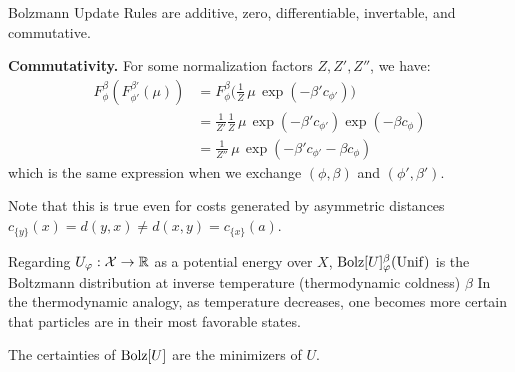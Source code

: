 \documentclass{article}
\newcommand{\Unif}{\mathrm{Unif}}
\begin{document}
\begin{prop}
    Bolzmann Update Rules are additive, zero, differentiable, invertable, and commutative.
\end{prop}

\begin{lproof}
    \textbf{Commutativity.}
    For some normalization factors $Z, Z', Z''$, we have:
    \begin{align*}
         F^\beta_\phi( F^{\beta'}_{\phi'}(\mu))
         &= F^\beta_\phi \Big( \frac{1}{Z} \,\mu\, \exp(- \beta' c_{\phi'}) \Big) \\
         &= \frac{1}{Z'} \frac{1}{Z} \,\mu\, \exp(- \beta' c_{\phi'}) \exp(- \beta c_{\phi}) \\
         &= \frac{1}{Z''} \,\mu\, \exp(-\beta' c_{\phi'} - \beta c_\phi)
    \end{align*}
    which is the same expression when we exchange $(\phi, \beta)$ and $(\phi', \beta')$.
\end{lproof}

Note that this is true even for costs generated by asymmetric distances $c_{\{y\}}(x) = d(y, x) \ne d(x,y) = c_{\{x\}}(a)$.


\begin{remark}
    Regarding $U_\varphi : \mathcal X \to \mathbb R$ as a potential energy over $X$,
    $\Bolz U^\beta_\varphi(\Unif)$ is the Boltzmann distribution at inverse temperature (thermodynamic coldness) $\beta$
    In the thermodynamic analogy, as temperature decreases, one becomes more certain that particles are in their most favorable states.
\end{remark}


The certainties of $\mathrm{Bolz}[U]$ are the minimizers of $U$.
\end{document}
